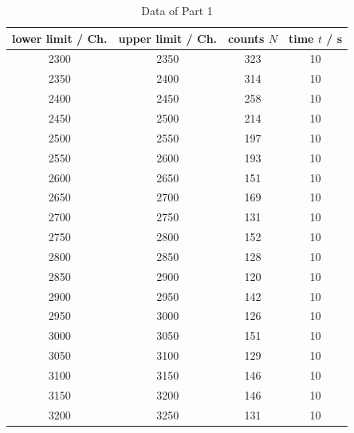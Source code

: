 \documentclass[11pt,a4paper,notitlepage]{scrartcl}
\begin{document}
\begin{table}[H]
	\ContinuedFloat
	\centering
	\begin{tabular}{c|c|c|c}
		lower limit / Ch. & upper limit / Ch. & {counts} $N$ & {time} $t$ / s\\
		\hline
		{2300}              & 2350                       & 323             & 10           \\
		{2350}              & 2400                       & 314             & 10           \\
		{2400}              & 2450                       & 258             & 10           \\
		{2450}              & 2500                       & 214             & 10           \\
		{2500}              & 2550                       & 197             & 10           \\
		{2550}              & 2600                       & 193             & 10           \\
		{2600}              & 2650                       & 151             & 10           \\
		{2650}              & 2700                       & 169             & 10           \\
		{2700}              & 2750                       & 131             & 10           \\
		{2750}              & 2800                       & 152             & 10           \\
		{2800}              & 2850                       & 128             & 10           \\
		{2850}              & 2900                       & 120             & 10           \\
		{2900}              & 2950                       & 142             & 10           \\
		{2950}              & 3000                       & 126             & 10           \\
		{3000}              & 3050                       & 151             & 10           \\
		{3050}              & 3100                       & 129             & 10           \\
		{3100}              & 3150                       & 146             & 10           \\
		{3150}              & 3200                       & 146             & 10           \\
		{3200}              & 3250                       & 131             & 10          
	\end{tabular}
	\caption{Data of Part 1}
\end{table}
\end{document}
